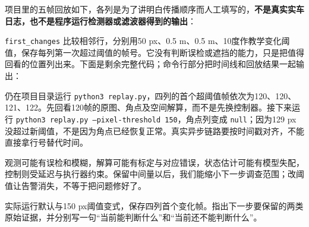 项目里的五帧回放如下，各列是为了讲明白传播顺序而人工填写的，\textbf{不是真实实车日志，也不是程序运行检测器或滤波器得到的输出}：


\texttt{first\_changes} 比较相邻行，分别用50 px、0.5 m、0.5 m、10度作教学变化阈值，保存每列第一次超过阈值的帧号。它没有判断误检或遮挡的能力，只是把值得回看的位置列出来。下面是剩余完整代码；命令行部分把时间线和回放结果一起输出：


\begin{example}[追到最早可见的变化]
仍在项目目录运行 \texttt{python3 replay.py}，四列的首个超阈值帧依次为120、120、121、122。先回看120帧的原图、角点及空间解算，而不是先换控制器。接下来运行 \texttt{python3 replay.py --pixel-threshold 150}，角点列变成 \texttt{null}；因为129 px没超过新阈值，不是因为角点已经恢复正常。真实异步链路要按时间戳对齐，不能直接拿行号替代时间。
\end{example}

\begin{conclusion}
观测可能有误检和模糊，解算可能有标定与对应错误，状态估计可能有模型失配，控制则受延迟与执行器约束。保留中间量以后，我们能缩小下一步调查范围；改阈值让告警消失，不等于把问题修好了。
\end{conclusion}

\begin{exercise}
\label{v3-ex-aim-6}
实际运行默认与150 px阈值变式，保存四列首个变化帧。指出下一步要保留的两类原始证据，并分别写一句“当前能判断什么”和“当前还不能判断什么”。
\end{exercise}
